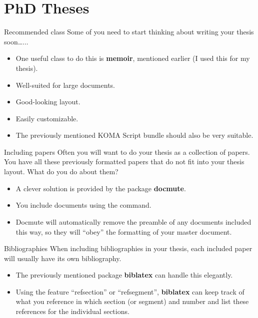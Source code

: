 \documentclass[english]{beamer}
\begin{document}
\section{PhD Theses}

\begin{frame}{\insertsection}{Recommended class}
  Some of you need to start thinking about writing your thesis soon\ldots...
  \begin{itemize}
  \item One useful class to do this is \textbf{memoir}, mentioned
    earlier (I used this for my thesis).
  \item Well-suited for large documents.
  \item Good-looking layout.
  \item Easily customizable.
  \item The previously mentioned KOMA Script bundle should also be
    very suitable.
  \end{itemize}
\end{frame}

\begin{frame}[fragile]{\insertsection}{Including papers}
  Often you will want to do your thesis as a collection of papers. You
  have all these previously formatted papers that do not fit into your
  thesis layout. What do you do about them?
  \begin{itemize}
  \item A clever solution is provided by the package \textbf{docmute}.
  \item You include documents using the  \verb|| command.
  \item Docmute will automatically remove the preamble of any
    documents included this way, so they will ``obey'' the formatting
    of your master document.
  \end{itemize}
\end{frame}

\begin{frame}{\insertsection}{Bibliographies}
  When including bibliographies in your thesis, each included paper
  will usually have its own bibliography.
  \begin{itemize}
  \item The previously mentioned package \textbf{biblatex} can handle
    this elegantly.
  \item Using the feature ``refsection'' or ``refsegment'',
    \textbf{biblatex} can keep track of what you reference in which
    section (or segment) and number and list these references for the
    individual sections.
  \end{itemize}
\end{frame}

\end{document}
